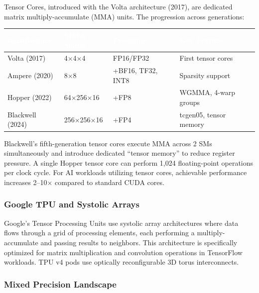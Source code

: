 \documentclass[11pt,letterpaper]{article}
\newcommand{\tableheader}[1]{\textbf{\sffamily\textcolor{white}{#1}}}
\begin{document}
Tensor Cores, introduced with the Volta architecture (2017), are dedicated matrix multiply-accumulate (MMA) units. The progression across generations:

\begin{center}
\begin{tabularx}{\textwidth}{L{2.5cm}L{3cm}L{2.5cm}X}
\toprule
{}
\tableheader{Architecture} & \tableheader{MMA Shape} & \tableheader{Precisions} & \tableheader{Key Feature} \\
\midrule
Volta (2017) & 4$\times$4$\times$4 & FP16/FP32 & First tensor cores \\
Ampere (2020) & 8$\times$8 & +BF16, TF32, INT8 & Sparsity support \\
Hopper (2022) & 64$\times$256$\times$16 & +FP8 & WGMMA, 4-warp groups \\
Blackwell (2024) & 256$\times$256$\times$16 & +FP4 & tcgen05, tensor memory \\
\bottomrule
\end{tabularx}
\end{center}

Blackwell's fifth-generation tensor cores execute MMA across 2 SMs simultaneously and introduce dedicated ``tensor memory'' to reduce register pressure. A single Hopper tensor core can perform 1,024 floating-point operations per clock cycle. For AI workloads utilizing tensor cores, achievable performance increases 2--10$\times$ compared to standard CUDA cores.

\subsubsection{Google TPU and Systolic Arrays}

Google's Tensor Processing Units use systolic array architectures where data flows through a grid of processing elements, each performing a multiply-accumulate and passing results to neighbors. This architecture is specifically optimized for matrix multiplication and convolution operations in TensorFlow workloads. TPU v4 pods use optically reconfigurable 3D torus interconnects.

\subsubsection{Mixed Precision Landscape}
\end{document}
